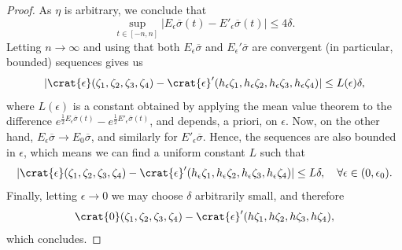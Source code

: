\documentclass[reqno,11pt]{amsart}
\begin{document}
\begin{proof}
As \(\eta\) is arbitrary, we conclude that 
\[
    \sup_{t \in [-n,n]}|E_\epsilon\overline{\sigma}(t) - E'_\epsilon\overline{\sigma}(t)| \leq 4\delta.
\]
Letting \(n \to \infty\) and using that both \(E_\epsilon\overline{\sigma}\) and \(E_\epsilon'\overline{\sigma}\) are convergent (in particular, bounded) sequences gives us 
\[
    |\crat{\epsilon}(\zeta_1, \zeta_2, \zeta_3, \zeta_4) - 
    \crat{\epsilon}'(h_\epsilon\zeta_1, h_\epsilon\zeta_2, h_\epsilon\zeta_3, h_\epsilon\zeta_4)| \leq L(\epsilon)\delta, 
\]
where \(L(\epsilon)\) is a constant obtained by applying the mean value theorem to the difference \(e^{\frac{1}{2}E_\epsilon\overline{\sigma}(t)} - e^{\frac{1}{2}E'_\epsilon\overline{\sigma}(t)}\), and depends, a priori, on \(\epsilon\).
Now, on the other hand, \(E_\epsilon\overline{\sigma} \to E_0\overline{\sigma}\), and similarly for \(E'_\epsilon\overline{\sigma}\). 
Hence, the sequences are also bounded in \(\epsilon\), which means we can find a uniform constant \(L\) such that
\[
    |\crat{\epsilon}(\zeta_1, \zeta_2, \zeta_3, \zeta_4) - 
    \crat{\epsilon}'(h_\epsilon\zeta_1, h_\epsilon\zeta_2, h_\epsilon\zeta_3, h_\epsilon\zeta_4)| \leq L\delta, \quad \forall \epsilon \in (0, \epsilon_0).
\]
Finally, letting \(\epsilon \to 0\) we may choose \(\delta\) arbitrarily small, and therefore
\[
    \crat{0}(\zeta_1, \zeta_2, \zeta_3, \zeta_4) - 
    \crat{\epsilon}'(h\zeta_1, h\zeta_2, h\zeta_3, h\zeta_4),
\]
which concludes.
\end{proof}
\end{document}
